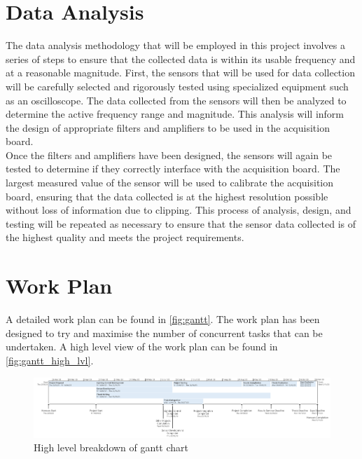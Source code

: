 \section{Data Analysis}
The data analysis methodology that will be employed in this project involves a series of steps
to ensure that the collected data is within its usable frequency and at a reasonable magnitude.
First, the sensors that will be used for data collection will be carefully selected and rigorously tested
using specialized equipment such as an oscilloscope.
The data collected from the sensors will then be analyzed to determine the active frequency range and magnitude.
This analysis will inform the design of appropriate filters and amplifiers to be used in the acquisition board.
\\
Once the filters and amplifiers have been designed, the sensors will again be tested to determine if they correctly interface with the acquisition board.
The largest measured value of the sensor will be used to calibrate the acquisition board,
ensuring that the data collected is at the highest resolution possible without loss of information due to clipping.
This process of analysis, design, and testing will be repeated as necessary
to ensure that the sensor data collected is of the highest quality and meets the project requirements.

\section{Work Plan}
A detailed work plan can be found in \autoref{fig:gantt}.
The work plan has been designed to try and maximise the number of concurrent tasks that can be undertaken.
A high level view of the work plan can be found in \autoref{fig:gantt_high_lvl}.

\begin{figure}[!ht]
    \caption{High level breakdown of gantt chart}\label{fig:gantt_high_lvl}
    \centering
    \includegraphics[width=2\columnwidth]{chapters/project_plan/figures/Gantt_Chart_High_Level}
\end{figure}

